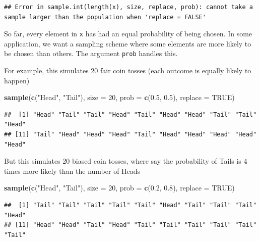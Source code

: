 \documentclass[]{book}
\newenvironment{Shaded}{\begin{snugshade}}{\end{snugshade}}
\newcommand{\KeywordTok}[1]{\textcolor[rgb]{0.13,0.29,0.53}{\textbf{#1}}}
\newcommand{\DataTypeTok}[1]{\textcolor[rgb]{0.13,0.29,0.53}{#1}}
\newcommand{\DecValTok}[1]{\textcolor[rgb]{0.00,0.00,0.81}{#1}}
\newcommand{\FloatTok}[1]{\textcolor[rgb]{0.00,0.00,0.81}{#1}}
\newcommand{\StringTok}[1]{\textcolor[rgb]{0.31,0.60,0.02}{#1}}
\newcommand{\OtherTok}[1]{\textcolor[rgb]{0.56,0.35,0.01}{#1}}
\newcommand{\NormalTok}[1]{#1}
\theoremstyle{definition}
\theoremstyle{definition}
\theoremstyle{definition}
\theoremstyle{remark}
\begin{document}
\begin{verbatim}
## Error in sample.int(length(x), size, replace, prob): cannot take a sample larger than the population when 'replace = FALSE'
\end{verbatim}

So far, every element in \texttt{x} has had an equal probability of
being chosen. In some application, we want a sampling scheme where some
elements are more likely to be chosen than others. The argument
\texttt{prob} handles this.

For example, this simulates 20 fair coin tosses (each outcome is equally
likely to happen)

\begin{Shaded}
\begin{Highlighting}[]
\KeywordTok{sample}\NormalTok{(}\KeywordTok{c}\NormalTok{(}\StringTok{"Head"}\NormalTok{, }\StringTok{"Tail"}\NormalTok{), }\DataTypeTok{size =} \DecValTok{20}\NormalTok{, }\DataTypeTok{prob =} \KeywordTok{c}\NormalTok{(}\FloatTok{0.5}\NormalTok{, }\FloatTok{0.5}\NormalTok{), }\DataTypeTok{replace =} \OtherTok{TRUE}\NormalTok{)}
\end{Highlighting}
\end{Shaded}

\begin{verbatim}
##  [1] "Head" "Tail" "Tail" "Head" "Tail" "Head" "Head" "Tail" "Tail" "Head"
## [11] "Tail" "Head" "Head" "Head" "Tail" "Head" "Head" "Head" "Head" "Head"
\end{verbatim}

But this simulates 20 biased coin tosses, where say the probability of
Tails is 4 times more likely than the number of Heads

\begin{Shaded}
\begin{Highlighting}[]
\KeywordTok{sample}\NormalTok{(}\KeywordTok{c}\NormalTok{(}\StringTok{"Head"}\NormalTok{, }\StringTok{"Tail"}\NormalTok{), }\DataTypeTok{size =} \DecValTok{20}\NormalTok{, }\DataTypeTok{prob =} \KeywordTok{c}\NormalTok{(}\FloatTok{0.2}\NormalTok{, }\FloatTok{0.8}\NormalTok{), }\DataTypeTok{replace =} \OtherTok{TRUE}\NormalTok{)}
\end{Highlighting}
\end{Shaded}

\begin{verbatim}
##  [1] "Tail" "Tail" "Tail" "Tail" "Tail" "Head" "Tail" "Tail" "Tail" "Head"
## [11] "Head" "Head" "Tail" "Head" "Tail" "Tail" "Tail" "Tail" "Tail" "Tail"
\end{verbatim}
\end{document}
